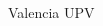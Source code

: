 \documentclass[a4paper]{article}
\begin{document}
\begin{multicols*}{2}
\begin{footnotesize}
Valencia UPV 
\end{footnotesize}
\end{multicols*}
\end{document}
